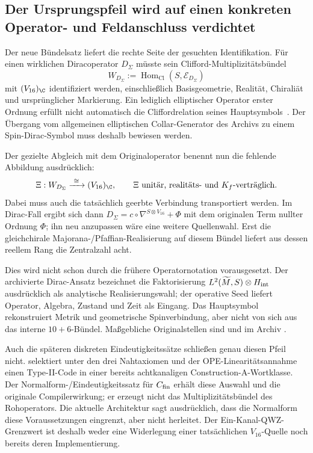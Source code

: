 \subsection{Der Ursprungspfeil wird auf einen konkreten Operator- und Feldanschluss verdichtet}
Der neue Bündelsatz liefert die rechte Seite der gesuchten Identifikation. Für einen wirklichen Diracoperator $D_\Sigma$ müsste sein Clifford-Multiplizitätsbündel
\begin{equation}
W_{D_\Sigma}:=\operatorname{Hom}_{\mathrm{Cl}}(S,\mathcal E_{D_\Sigma})
\end{equation}
mit $(V_{16})_{\C}$ identifiziert werden, einschließlich Basisgeometrie, Realität, Chiraliät und ursprünglicher Markierung. Ein lediglich elliptischer Operator erster Ordnung erfüllt nicht automatisch die Cliffordrelation seines Hauptsymbols~\cite{baerballmann}. Der Übergang vom allgemeinen elliptischen Collar-Generator des Archivs zu einem Spin-Dirac-Symbol muss deshalb bewiesen werden.

Der gezielte Abgleich mit dem Originaloperator benennt nun die fehlende Abbildung ausdrücklich:
\begin{equation}\label{eq:originalmultiplicitybridge}
 \Xi:W_{D_\Sigma}\xrightarrow{\ \cong\ }(V_{16})_{\C},
 \qquad \Xi\ \text{unitär, realitäts- und }K_f\text{-verträglich}.
\end{equation}
Dabei muss auch die tatsächlich geerbte Verbindung transportiert werden. Im Dirac-Fall ergibt sich dann
$D_\Sigma=c\circ\nabla^{S\otimes V_{16}}+\Phi$ mit dem originalen Term nullter Ordnung $\Phi$; ihn neu anzupassen wäre eine weitere Quellenwahl. Erst die gleichchirale Majorana-/Pfaffian-Realisierung auf diesem Bündel liefert aus dessen reellem Rang die Zentralzahl acht.

Dies wird nicht schon durch die frühere Operatornotation vorausgesetzt. Der archivierte Dirac-Ansatz bezeichnet die Faktorisierung $L^2(\widetilde M,S)\otimes H_{\rm int}$ ausdrücklich als analytische Realisierungswahl; der operative Seed liefert Operator, Algebra, Zustand und Zeit als Eingang. Das Hauptsymbol rekonstruiert Metrik und geometrische Spinverbindung, aber nicht von sich aus das interne $10+6$-Bündel. Maßgebliche Originalstellen sind  und  im Archiv .

Auch die späteren diskreten Eindeutigkeitssätze schließen genau diesen Pfeil nicht.  selektiert unter den drei Nahtaxiomen und der OPE-Linearitätsannahme einen Type-II-Code in einer bereits achtkanaligen Construction-A-Wortklasse. Der Normalform-/Eindeutigkeitssatz für $C_{\rm fin}$ erhält diese Auswahl und die originale Compilerwirkung; er erzeugt nicht das Multiplizitätsbündel des Rohoperators. Die aktuelle Architektur sagt ausdrücklich, dass die Normalform diese Voraussetzungen eingrenzt, aber nicht herleitet. Der Ein-Kanal-QWZ-Grenzwert ist deshalb weder eine Widerlegung einer tatsächlichen $V_{16}$-Quelle noch bereits deren Implementierung.

